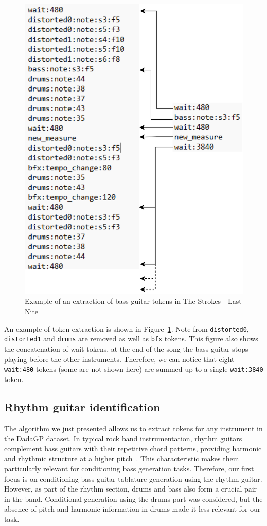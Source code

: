 \begin{figure}[!ht]
    \centering
    \includegraphics[width=.4\linewidth]{../images-figures/token_extraction.png}
    \caption{Example of an extraction of bass guitar tokens in The Strokes - Last Nite}
    \label{fig:token_extraction}
\end{figure}

An example of token extraction is shown in Figure~\ref{fig:token_extraction}.
Note from \texttt{distorted0}, \texttt{distorted1} and \texttt{drums} are removed as well as \texttt{bfx} tokens.
This figure also shows the concatenation of wait tokens, at the end of the song the bass guitar stops playing before the other instruments.
Therefore, we can notice that eight \texttt{wait:480} tokens (some are not shown here) are summed up to a single \texttt{wait:3840} token.



\subsection{Rhythm guitar identification}

The algorithm we just presented allows us to extract tokens for any instrument in the DadaGP dataset.
In typical rock band instrumentation, rhythm guitars complement bass guitars with their repetitive chord patterns, providing harmonic and rhythmic structure at a higher pitch~\cite{regnier_identification_2021}.
This characteristic makes them particularly relevant for conditioning bass generation tasks. Therefore, our first focus is on conditioning bass guitar tablature generation using the rhythm guitar.
However, as part of the rhythm section, drums and bass also form a crucial pair in the band.
Conditional generation using the drums part was considered, but the absence of pitch and harmonic information in drums made it less relevant for our task.


